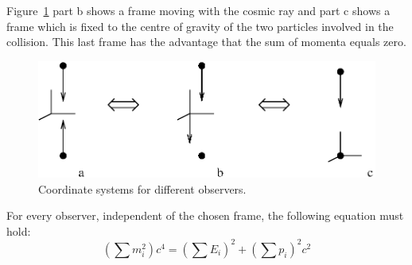 \documentclass[12pt,a4paper]{article}
\numberwithin{equation}{section}
\numberwithin{figure}{section}
\numberwithin{table}{section}
\begin{document}
Figure~\ref{fig:observers} part b shows a frame moving with the cosmic ray and part c shows a frame which is fixed to the centre of gravity of the two particles involved in the collision. This last frame has the advantage that the sum of momenta equals zero.

\begin{figure}\begin{center}
\includegraphics[scale=1]{observers.eps}%
\caption{Coordinate systems for different observers.}\label{fig:observers}
\end{center}\end{figure}

For every observer, independent of the chosen frame, the following equation must hold:
\begin{equation}
\left(  \sum m_i^2 \right)  c^4 = \left(  \sum E_i \right)^2 + \left(  \sum p_i \right)^2 c^2 \label{eq:frame_indep}
\end{equation}
\end{document}
